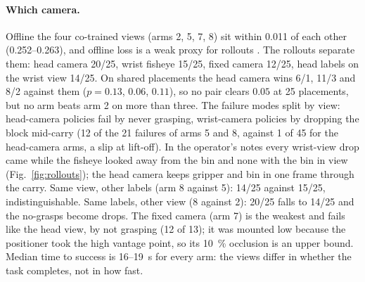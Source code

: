 \paragraph{Which camera.}
Offline the four co-trained views (arms 2, 5, 7, 8) sit within 0.011 of each other (0.252--0.263), and offline loss is a weak proxy for rollouts \citep{mandlekar2021robomimic}. The rollouts separate them: head camera 20/25, wrist fisheye 15/25, fixed camera 12/25, head labels on the wrist view 14/25. On shared placements the head camera wins 6/1, 11/3 and 8/2 against them ($p = 0.13$, $0.06$, $0.11$), so no pair clears $0.05$ at 25 placements, but no arm beats arm 2 on more than three. The failure modes split by view: head-camera policies fail by never grasping, wrist-camera policies by dropping the block mid-carry (12 of the 21 failures of arms 5 and 8, against 1 of 45 for the head-camera arms, a slip at lift-off). In the operator's notes every wrist-view drop came while the fisheye looked away from the bin and none with the bin in view (Fig.~\ref{fig:rollouts}); the head camera keeps gripper and bin in one frame through the carry. Same view, other labels (arm 8 against 5): 14/25 against 15/25, indistinguishable. Same labels, other view (8 against 2): 20/25 falls to 14/25 and the no-grasps become drops. The fixed camera (arm 7) is the weakest and fails like the head view, by not grasping (12 of 13); it was mounted low because the positioner took the high vantage point, so its \SI{10}{\percent} occlusion is an upper bound. Median time to success is \SI{16}{}--\SI{19}{s} for every arm: the views differ in whether the task completes, not in how fast.
